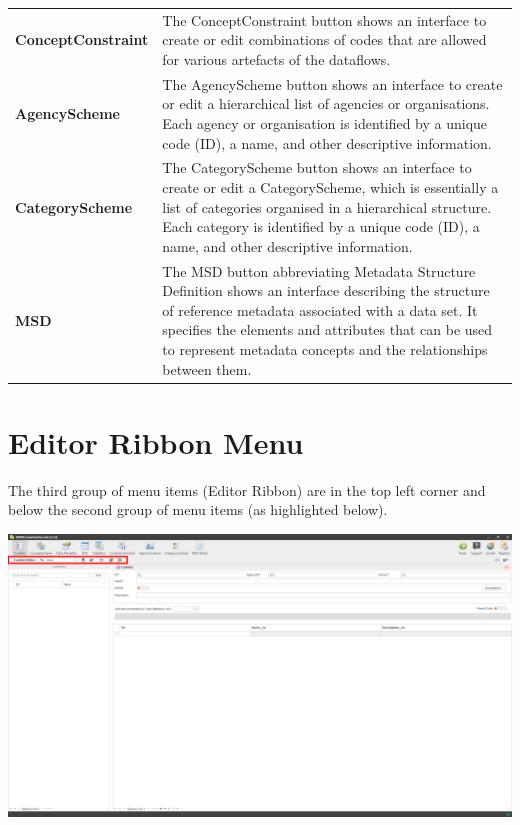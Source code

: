 \documentclass[
]{book}
\begin{document}
\begin{longtable}[]{@{}
  >{\raggedright\arraybackslash}p{}
  >{\raggedright\arraybackslash}p{}@{}}
\textbf{ConceptConstraint} & The ConceptConstraint button shows an interface to create or edit combinations of codes that are allowed for various artefacts of the dataflows. \\
\textbf{AgencyScheme} & The AgencyScheme button shows an interface to create or edit a hierarchical list of agencies or organisations. Each agency or organisation is identified by a unique code (ID), a name, and other descriptive information. \\
\textbf{CategoryScheme} & The CategoryScheme button shows an interface to create or edit a CategoryScheme, which is essentially a list of categories organised in a hierarchical structure. Each category is identified by a unique code (ID), a name, and other descriptive information. \\
\textbf{MSD} & The MSD button abbreviating Metadata Structure Definition shows an interface describing the structure of reference metadata associated with a data set. It specifies the elements and attributes that can be used to represent metadata concepts and the relationships between them. \\
\end{longtable}

\hypertarget{editor-ribbon-menu}{%
\section{Editor Ribbon Menu}\label{editor-ribbon-menu}}

The third group of menu items (Editor Ribbon) are in the top left corner and below the second group of menu items (as highlighted below).

\begin{center}\includegraphics[width=1\linewidth]{./images/image015} \end{center}
\end{document}

